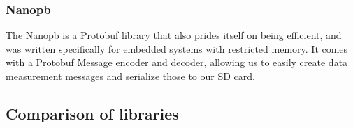 \subsubsection{Nanopb}
The \href{https://github.com/nanopb/nanopb}{Nanopb} is a Protobuf library that also prides itself on being efficient, and was written specifically for embedded systems with restricted memory. It comes with a Protobuf Message encoder and decoder, allowing us to easily create data measurement messages and serialize those to our SD card.

\subsection{Comparison of libraries}
\begin{table}[h]
\end{table}

